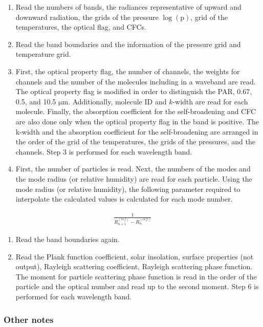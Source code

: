 \begin{enumerate}
\def\labelenumi{\arabic{enumi}.}
\item
  Read the numbers of bands, the radiances representative of upward and downward radiation, the grids of the pressure \(\log (\mathrm{p})\), grid of the temperatures, the optical flag, and CFCs.
\item
  Read the band boundaries and the information of the pressure grid and temperature grid.
\item
  First, the optical property flag, the number of channels, the weights for channels and the number of the molecules including in a waveband are read. The optical property flag is modified in order to
  distinguish the PAR, 0.67, 0.5, and 10.5 \(\mathrm{{\mu}m}\). Additionally, molecule ID and \(k\)-width are read for each molecule. Finally, the absorption coefficient for the self-broadening and
  CFC are also done only when the optical property flag in the band is positive. The k-width and the absorption coefficient for the self-broadening are arranged in the order of the grid of the
  temperatures, the grids of the pressures, and the channels. Step 3 is performed for each wavelength band.
\item
  First, the number of particles is read. Next, the numbers of the modes and the mode radius (or relative humidity) are read for each particle. Using the mode radius (or relative humidity), the
  following parameter required to interpolate the calculated values is calculated for each mode number.
\end{enumerate}

\begin{eqnarray}
   \frac{1}{R_{n+1}^{(r e f)}-R_{n}^{(r e f)}}
\end{eqnarray}

\begin{enumerate}
\def\labelenumi{\arabic{enumi}.}
\setcounter{enumi}{4}
\item
  Read the band boundaries again.
\item
  Read the Plank function coefficient, solar insolation, surface properties (not output), Rayleigh scattering coefficient, Rayleigh scattering phase function. The moment for particle scattering phase
  function is read in the order of the particle and the optical number and read up to the second moment. Step 6 is performed for each wavelength band.
\end{enumerate}

\hypertarget{other-notes}{%
\subsubsection{Other notes}\label{other-notes}}

